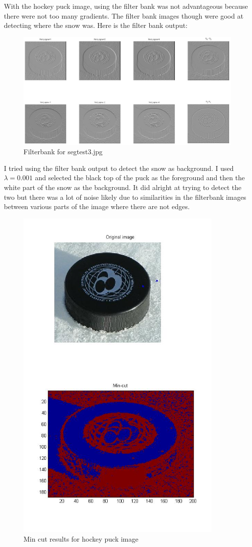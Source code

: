 \documentclass[11pt,psfig]{article}
\begin{document}
With the hockey puck image, using the filter bank was not advantageous because there were not too many gradients. The filter bank images though were good at detecting where the snow was. Here is the filter bank output:

\begin{figure}[H]
\centering
\includegraphics[width=7in]{prob5plotB_3_filter.jpg}
\caption{Filterbank for segtest3.jpg}
\end{figure}

I tried using the filter bank output to detect the snow as background. I used $\lambda=0.001$ and selected the black top of the puck as the foreground and then the white part of the snow as the background. It did alright at trying to detect the two but there was a lot of noise likely due to similarities in the filterbank images between various parts of the image where there are not edges. 

\begin{figure}[H]
\centering
\includegraphics[width=4in]{prob5plotB_3.jpg}
\caption{Min cut results for hockey puck image}
\end{figure}
\end{document}
